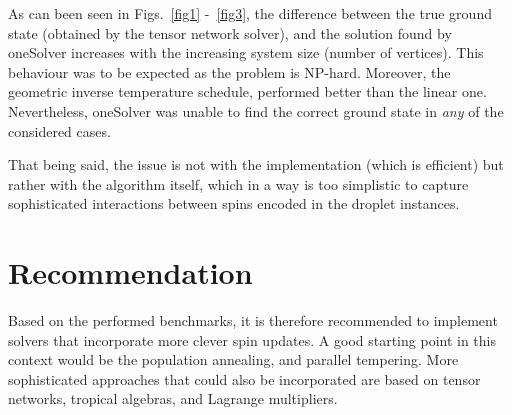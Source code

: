 \documentclass[]{report}
\begin{document}
As can been seen in Figs.~\ref{fig1} -~\ref{fig3}, the difference between the true ground state (obtained by the tensor network solver), and the solution found by oneSolver 
increases with the increasing system size (number of vertices). This behaviour was to be expected as the problem is NP-hard.
Moreover, the geometric inverse temperature schedule, performed better than the linear one.  Nevertheless, oneSolver was unable 
to find the correct ground state in \emph{any} of the considered cases. 

That being said, the issue is not with the implementation (which is efficient) but rather with the algorithm itself, which in a way is too simplistic to capture sophisticated interactions
between spins encoded in the droplet instances.

\section{Recommendation}

Based on the performed benchmarks, it is therefore recommended to implement solvers that incorporate more clever spin updates. 
A good starting point in this context would be the population annealing, and parallel tempering. More sophisticated approaches that 
could also be incorporated are based on tensor networks, tropical algebras, and Lagrange multipliers. 
\end{document}

